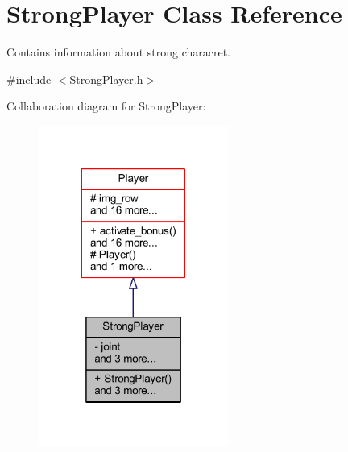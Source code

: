\hypertarget{class_strong_player}{}\section{Strong\+Player Class Reference}
\label{class_strong_player}


Contains information about strong characret.  




{\ttfamily \#include $<$Strong\+Player.\+h$>$}



Collaboration diagram for Strong\+Player\+:\nopagebreak
\begin{figure}[H]
\begin{center}
\leavevmode
\includegraphics[width=176pt]{class_strong_player__coll__graph}
\end{center}
\end{figure}
